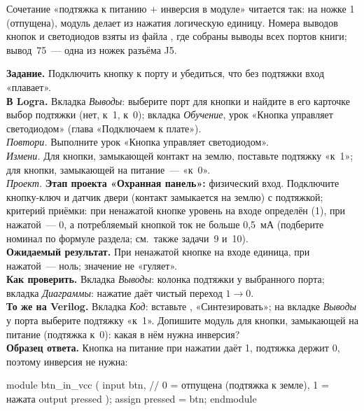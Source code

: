 Сочетание «подтяжка к питанию $+$ инверсия в модуле» читается так: на ножке 1
(отпущена), модуль делает из нажатия логическую единицу. Номера выводов
кнопок и светодиодов взяты из файла , где
собраны выводы всех портов книги; вывод~75~--- одна из ножек разъёма J5.

\begin{diybox}
\textbf{Задание.} Подключить кнопку к порту и убедиться, что без подтяжки
вход «плавает».\\
\textbf{В Logra.} Вкладка \emph{Выводы}: выберите порт для кнопки и найдите в
его карточке выбор подтяжки (нет, к~1, к~0); вкладка \emph{Обучение}, урок
«Кнопка управляет светодиодом» (глава «Подключаем к плате»).\\
 \emph{Повтори.} Выполните урок «Кнопка управляет светодиодом».\\
 \emph{Измени.} Для кнопки, замыкающей контакт на землю, поставьте
подтяжку «к~1»; для кнопки, замыкающей на питание~--- «к~0».\\
 \emph{Проект.} \textbf{Этап проекта «Охранная панель»:} физический
вход. Подключите кнопку-ключ и датчик двери (контакт замыкается на землю) с
подтяжкой; критерий приёмки: при ненажатой кнопке уровень на входе
определён (1), при нажатой~--- 0, а потребляемый кнопкой ток не больше
0,5~мА (подберите номинал по формуле раздела; см.\ также
задачи~9 и~10).\\
\textbf{Ожидаемый результат.} При ненажатой кнопке на входе единица, при
нажатой~--- ноль; значение не «гуляет».\\
\textbf{Как проверить.} Вкладка \emph{Выводы}: колонка подтяжки у выбранного
порта; вкладка \emph{Диаграммы}: нажатие даёт чистый переход $1\to0$.\\
\textbf{То же на Verilog.} Вкладка \emph{Код}: вставьте ,
«Синтезировать»; на вкладке \emph{Выводы} у порта  выберите
подтяжку «к~1».  Допишите модуль для кнопки, замыкающей на питание
(подтяжка к~0): какая в нём нужна инверсия?\\
\textbf{Образец ответа.} Кнопка на питание при нажатии даёт 1, подтяжка держит
0, поэтому инверсия не нужна:
\end{diybox}

\begin{vcode}
module btn_in_vcc (
    input  btn,                  // 0 = отпущена (подтяжка к земле), 1 = нажата
    output pressed
);
    assign pressed = btn;
endmodule
\end{vcode}


